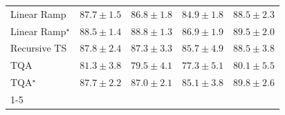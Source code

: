 \begin{tabular}{l|cccc|}
Linear Ramp & {\cellcolor[HTML]{045483}} \color[HTML]{F1F1F1} $87.7\pm 1.5$ & {\cellcolor[HTML]{045A8D}} \color[HTML]{F1F1F1} $86.8\pm 1.8$ & {\cellcolor[HTML]{04639B}} \color[HTML]{F1F1F1} $84.9\pm 1.8$ & {\cellcolor[HTML]{034E7B}} \color[HTML]{F1F1F1} $88.5\pm 2.3$ \\
Linear Ramp$^\star$ & {\cellcolor[HTML]{034E7B}} \color[HTML]{F1F1F1} $88.5\pm 1.4$ & {\cellcolor[HTML]{034C78}} \color[HTML]{F1F1F1} $88.8\pm 1.3$ & {\cellcolor[HTML]{045A8D}} \color[HTML]{F1F1F1} $86.9\pm 1.9$ & {\cellcolor[HTML]{03476F}} \color[HTML]{F1F1F1} $89.5\pm 2.0$ \\
Recursive TS & {\cellcolor[HTML]{045382}} \color[HTML]{F1F1F1} $87.8\pm 2.4$ & {\cellcolor[HTML]{045788}} \color[HTML]{F1F1F1} $87.3\pm 3.3$ & {\cellcolor[HTML]{046096}} \color[HTML]{F1F1F1} $85.7\pm 4.9$ & {\cellcolor[HTML]{034E7B}} \color[HTML]{F1F1F1} $88.5\pm 3.8$ \\
TQA & {\cellcolor[HTML]{0F76B3}} \color[HTML]{F1F1F1} $81.3\pm 3.8$ & {\cellcolor[HTML]{2182B9}} \color[HTML]{F1F1F1} $79.5\pm 4.1$ & {\cellcolor[HTML]{3991C1}} \color[HTML]{F1F1F1} $77.3\pm 5.1$ & {\cellcolor[HTML]{1B7EB7}} \color[HTML]{F1F1F1} $80.1\pm 5.5$ \\
TQA$^\star$ & {\cellcolor[HTML]{045483}} \color[HTML]{F1F1F1} $87.7\pm 2.2$ & {\cellcolor[HTML]{04598C}} \color[HTML]{F1F1F1} $87.0\pm 2.1$ & {\cellcolor[HTML]{04629A}} \color[HTML]{F1F1F1} $85.1\pm 3.8$ & {\cellcolor[HTML]{03456C}} \color[HTML]{F1F1F1} $89.8\pm 2.6$ \\
\cline{1-5}
\bottomrule
\end{tabular}

